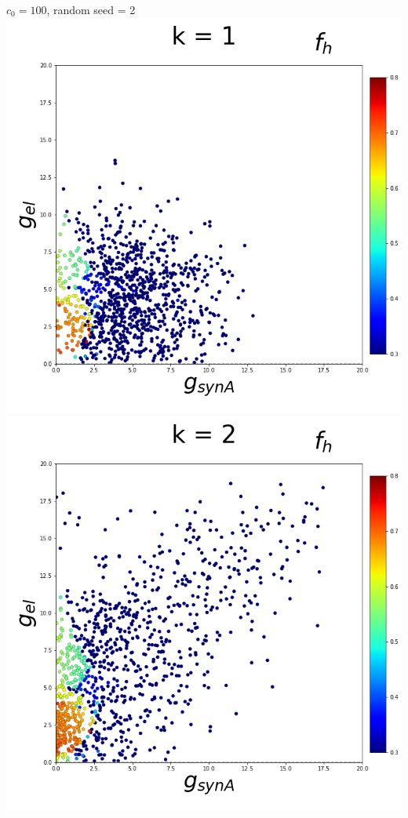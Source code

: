\documentclass[11pt]{article}
\begin{document}
\begin{center}
{\Large $c_0 = 100$, random seed = 2} \\
\includegraphics[scale=0.125]{DSN_figs/STGCircuit_DSN_c=2_rs=2_k=1.png}
\includegraphics[scale=0.125]{DSN_figs/STGCircuit_DSN_c=2_rs=2_k=2.png}

\end{center}
\end{document}
